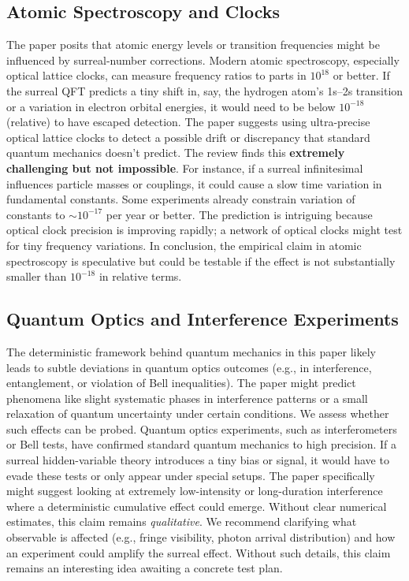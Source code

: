 \documentclass{article}
\begin{document}
\subsection*{Atomic Spectroscopy and Clocks}
The paper posits that atomic energy levels or transition frequencies might be influenced by surreal-number corrections. Modern atomic spectroscopy, especially optical lattice clocks, can measure frequency ratios to parts in $10^{18}$ or better. If the surreal QFT predicts a tiny shift in, say, the hydrogen atom’s 1s--2s transition or a variation in electron orbital energies, it would need to be below $10^{-18}$ (relative) to have escaped detection. The paper suggests using ultra-precise optical lattice clocks to detect a possible drift or discrepancy that standard quantum mechanics doesn’t predict. The review finds this \textbf{extremely challenging but not impossible}. For instance, if a surreal infinitesimal influences particle masses or couplings, it could cause a slow time variation in fundamental constants. Some experiments already constrain variation of constants to $\sim 10^{-17}$ per year or better. The prediction is intriguing because optical clock precision is improving rapidly; a network of optical clocks might test for tiny frequency variations. In conclusion, the empirical claim in atomic spectroscopy is speculative but could be testable if the effect is not substantially smaller than $10^{-18}$ in relative terms.

\subsection*{Quantum Optics and Interference Experiments}
The deterministic framework behind quantum mechanics in this paper likely leads to subtle deviations in quantum optics outcomes (e.g., in interference, entanglement, or violation of Bell inequalities). The paper might predict phenomena like slight systematic phases in interference patterns or a small relaxation of quantum uncertainty under certain conditions. We assess whether such effects can be probed. Quantum optics experiments, such as interferometers or Bell tests, have confirmed standard quantum mechanics to high precision. If a surreal hidden-variable theory introduces a tiny bias or signal, it would have to evade these tests or only appear under special setups. The paper specifically might suggest looking at extremely low-intensity or long-duration interference where a deterministic cumulative effect could emerge. Without clear numerical estimates, this claim remains \emph{qualitative}. We recommend clarifying what observable is affected (e.g., fringe visibility, photon arrival distribution) and how an experiment could amplify the surreal effect. Without such details, this claim remains an interesting idea awaiting a concrete test plan.
\end{document}
